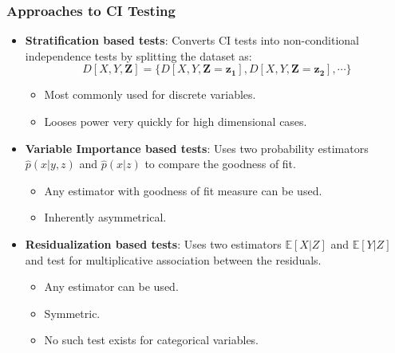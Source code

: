 \documentclass{beamer}
\begin{document}
\begin{frame}
	\frametitle{Approaches to CI Testing}
	\begin{itemize}
 		\setlength\itemsep{1em}
		\item \textbf{Stratification based tests}: Converts CI tests into 
			non-conditional independence tests by
			splitting the dataset as:
			$$ D[X, Y, \bm{Z}] = \{ D[X, Y, \bm{Z}=\bm{z_1}], D[X, Y, \bm{Z}=\bm{z_2}], \cdots \} $$
			\vspace{-1.5em}
			\begin{itemize}
				\item Most commonly used for discrete variables.
				\item Looses power very quickly for high dimensional cases.
			\end{itemize}
		\item \textbf{Variable Importance based tests}: Uses two probability estimators $ \hat{p}(x | y, z) $ and $ \hat{p}(x | z) $ to compare the goodness of fit.
			\begin{itemize}
				\item Any estimator with goodness of fit measure can be used.
				\item Inherently asymmetrical.
			\end{itemize}
		\item \textbf{Residualization based tests}: Uses two estimators $
			\mathbb{E}[X | Z] $ and $ \mathbb{E}[Y|Z] $ and test
			for multiplicative association between the residuals.
			\begin{itemize}
				\item Any estimator can be used.
				\item Symmetric.
				\item No such test exists for categorical variables.
			\end{itemize}
	\end{itemize}
\end{frame}
\end{document}
